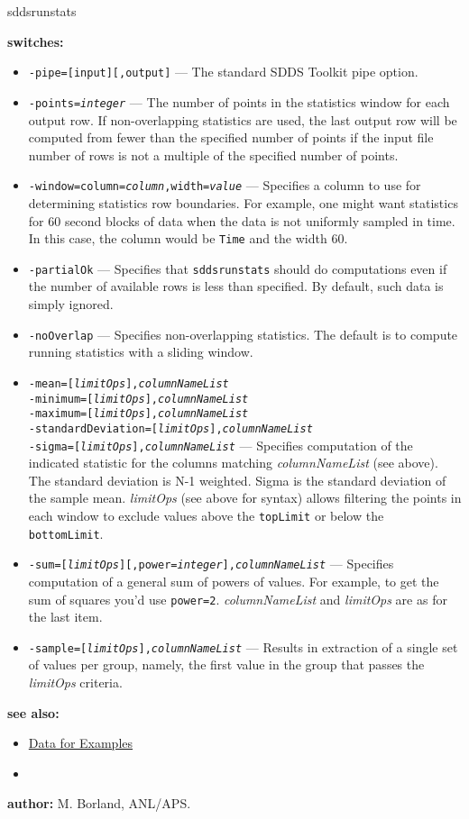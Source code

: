 \begin{sddsprog}{sddsrunstats}
  \item \textbf{switches:}
    \begin{itemize}
    \item {\tt -pipe=[input][,output]} --- The standard SDDS Toolkit pipe option.
    \item {\tt -points=\emph{integer}} --- The number of points in the statistics window for each output row. If non-overlapping statistics are used, the last output row will be computed from fewer than the specified number of points if the input file number of rows is not a multiple of the specified number of points.
    \item {\tt -window=column=\emph{column},width=\emph{value}} --- Specifies a column to use for determining statistics row boundaries. For example, one might want statistics for 60 second blocks of data when the data is not uniformly sampled in time. In this case, the column would be \verb|Time| and the width 60.
    \item {\tt -partialOk} --- Specifies that \verb|sddsrunstats| should do computations even if the number of available rows is less than specified. By default, such data is simply ignored.
    \item {\tt -noOverlap} --- Specifies non-overlapping statistics. The default is to compute running statistics with a sliding window.
    \item {\tt -mean=[\emph{limitOps}],\emph{columnNameList}}\\
      {\tt -minimum=[\emph{limitOps}],\emph{columnNameList}}\\
      {\tt -maximum=[\emph{limitOps}],\emph{columnNameList}}\\
      {\tt -standardDeviation=[\emph{limitOps}],\emph{columnNameList}}\\
      {\tt -sigma=[\emph{limitOps}],\emph{columnNameList}} --- Specifies computation of the indicated statistic for the columns matching \emph{columnNameList} (see above). The standard deviation is N-1 weighted. Sigma is the standard deviation of the sample mean. \emph{limitOps} (see above for syntax) allows filtering the points in each window to exclude values above the \verb|topLimit| or below the \verb|bottomLimit|.
    \item {\tt -sum=[\emph{limitOps}][,power=\emph{integer}],\emph{columnNameList}} --- Specifies computation of a general sum of powers of values. For example, to get the sum of squares you'd use \verb|power=2|. \emph{columnNameList} and \emph{limitOps} are as for the last item.
    \item {\tt -sample=[\emph{limitOps}],\emph{columnNameList}} --- Results in extraction of a single set of values per group, namely, the first value in the group that passes the \emph{limitOps} criteria.
    \end{itemize}

  \item \textbf{see also:}
    \begin{itemize}
    \item \hyperref[exampleData]{Data for Examples}
    \item {}
    \end{itemize}

  \item \textbf{author:} M. Borland, ANL/APS.
\end{sddsprog}

